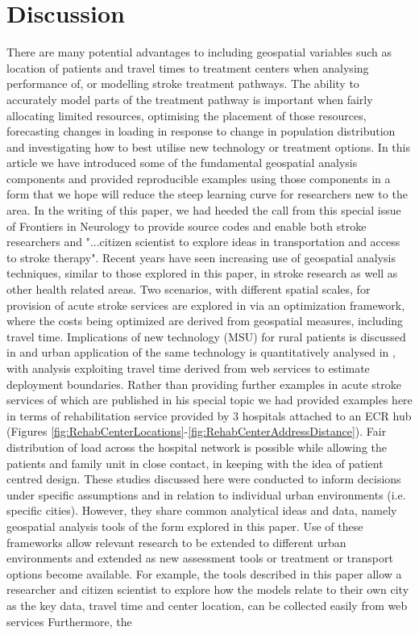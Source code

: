 \documentclass[utf8]{frontiersHLTH}
\begin{document}
\section{Discussion}\label{discussion} There are many potential advantages to including geospatial variables such as location of patients and travel times to treatment centers when analysing performance of, or modelling stroke treatment pathways. The ability to accurately model parts of the treatment pathway is important when fairly allocating limited resources, optimising the placement of those resources, forecasting changes in loading in response to change in population distribution and investigating how to best utilise new technology or treatment options. In this article we have introduced some of the fundamental geospatial analysis components and provided reproducible examples using those components in a form that we hope will reduce the steep learning curve for researchers new to the area. In the writing of this paper, we had heeded the call from this special issue of Frontiers in Neurology to provide source codes and enable both stroke researchers and "...citizen scientist to explore ideas in transportation and access to stroke therapy". Recent years have seen increasing use of geospatial analysis techniques, similar to those explored in this paper, in stroke research as well as other health related areas. Two scenarios, with different spatial scales, for provision of acute stroke services are explored in \cite{10.3389/fneur.2019.00150} via an optimization framework, where the costs being optimized are derived from geospatial measures, including travel time. Implications of new technology (MSU) for rural patients is discussed in \cite{10.3389/fneur.2019.00159} and urban application of the same technology is quantitatively analysed in \cite{10.3389/fneur.2019.00331}, with analysis exploiting travel time derived from web services to estimate deployment boundaries. Rather than providing further examples in acute stroke services of which are published in his special topic \cite{10.3389/fneur.2019.00150, 10.3389/fneur.2019.00159, 10.3389/fneur.2019.00331} we had provided examples here in terms of rehabilitation service provided by 3 hospitals attached to an ECR hub (Figures \ref{fig:RehabCenterLocations}-\ref{fig:RehabCenterAddressDistance}). Fair distribution of load across the hospital network is possible while allowing the patients and family unit in close contact, in keeping with the idea of patient centred design. These studies discussed here were conducted to inform decisions under specific assumptions and in relation to individual urban environments (i.e. specific cities). However, they share common analytical ideas and data, namely geospatial analysis tools of the form explored in this paper. Use of these frameworks allow relevant research to be extended to different urban environments and extended as new assessment tools or treatment or transport options become available. For example, the tools described in this paper allow a researcher and citizen scientist to explore how the models relate to their own city as the key data, travel time and center location, can be collected easily from web services \cite{10.1001/jamaneurol.2018.2424,Milne_2017} Furthermore, the 
\end{document}
